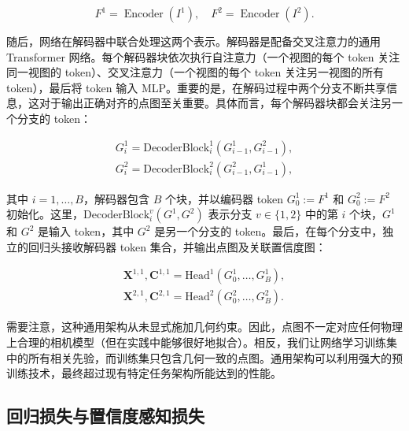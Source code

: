 \begin{equation*}
F ^ {1} = \operatorname{Encoder} (I ^ {1}), \quad F ^ {2} = \operatorname{Encoder} (I ^ {2}).
\end{equation*}

随后，网络在解码器中联合处理这两个表示。解码器是配备交叉注意力的通用 Transformer 网络。每个解码器块依次执行自注意力（一个视图的每个 token 关注同一视图的 token）、交叉注意力（一个视图的每个 token 关注另一视图的所有 token），最后将 token 输入 MLP。重要的是，在解码过程中两个分支不断共享信息，这对于输出正确对齐的点图至关重要。具体而言，每个解码器块都会关注另一个分支的 token：

\begin{equation*}
\begin{array}{l} G _ {i} ^ {1} = \text {DecoderBlock} _ {i} ^ {1} \left(G _ {i - 1} ^ {1}, G _ {i - 1} ^ {2}\right), \\ G _ {i} ^ {2} = \text {DecoderBlock} _ {i} ^ {2} \left(G _ {i - 1} ^ {2}, G _ {i - 1} ^ {1}\right), \end{array}
\end{equation*}

其中 $i=1,\ldots,B$，解码器包含 $B$ 个块，并以编码器 token $G_0^1:=F^1$ 和 $G_0^2:=F^2$ 初始化。这里，$\mathrm{DecoderBlock}_i^v(G^1,G^2)$ 表示分支 $v\in\{1,2\}$ 中的第 $i$ 个块，$G^1$ 和 $G^2$ 是输入 token，其中 $G^2$ 是另一个分支的 token。最后，在每个分支中，独立的回归头接收解码器 token 集合，并输出点图及关联置信度图：

\begin{equation*}
\begin{array}{l} \boldsymbol {X} ^ {1, 1}, \boldsymbol {C} ^ {1, 1} = \mathrm{Head} ^ {1} (G _ {0} ^ {1}, \ldots , G _ {B} ^ {1}), \\ \boldsymbol {X} ^ {2, 1}, \boldsymbol {C} ^ {2, 1} = \mathrm{Head} ^ {2} (G _ {0} ^ {2}, \ldots , G _ {B} ^ {2}). \end{array}
\end{equation*}

需要注意，这种通用架构从未显式施加几何约束。因此，点图不一定对应任何物理上合理的相机模型（但在实践中能够很好地拟合）。相反，我们让网络学习训练集中的所有相关先验，而训练集只包含几何一致的点图。通用架构可以利用强大的预训练技术，最终超过现有特定任务架构所能达到的性能。

\subsection{回归损失与置信度感知损失}

